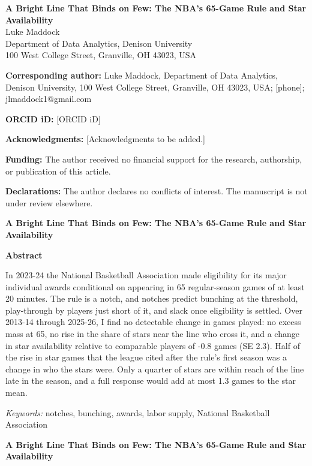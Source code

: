 \documentclass[12pt]{article}
\newcommand{\lone}[1]{\par\medskip\noindent\begin{center}\textbf{#1}\end{center}\par\nopagebreak}
\begin{document}
\thispagestyle{plain}
\begin{center}
{\large\textbf{A Bright Line That Binds on Few: The NBA's 65-Game Rule and Star Availability}}\\[2em]
Luke Maddock\\
Department of Data Analytics, Denison University\\
100 West College Street, Granville, OH 43023, USA\\[2em]
\end{center}
\noindent\textbf{Corresponding author:} 
Luke Maddock, Department of Data Analytics, Denison University, 100 West College Street, Granville, OH 43023, USA; [phone]; jlmaddock1@gmail.com
\par
\noindent\textbf{ORCID iD:} 
[ORCID iD]
\par
\noindent\textbf{Acknowledgments:} 
[Acknowledgments to be added.]
\par
\noindent\textbf{Funding:} 
The author received no financial support for the research, authorship, or publication of this article.
\par
\noindent\textbf{Declarations:} 
The author declares no conflicts of interest. The manuscript is not under review elsewhere.
\par
\clearpage
\begin{center}\textbf{
A Bright Line That Binds on Few: The NBA's 65-Game Rule and Star Availability
}\end{center}
\lone{Abstract}
\noindent 
In 2023-24 the National Basketball Association made eligibility for its major individual awards conditional on appearing in 65 regular-season games of at least 20 minutes. The rule is a notch, and notches predict bunching at the threshold, play-through by players just short of it, and slack once eligibility is settled. Over 2013-14 through 2025-26, I find no detectable change in games played: no excess mass at 65, no rise in the share of stars near the line who cross it, and a change in star availability relative to comparable players of -0.8 games (SE 2.3). Half of the rise in star games that the league cited after the rule's first season was a change in who the stars were. Only a quarter of stars are within reach of the line late in the season, and a full response would add at most 1.3 games to the star mean.
\par\bigskip
\noindent\emph{Keywords:} 
notches, bunching, awards, labor supply, National Basketball Association
\clearpage
\begin{center}\textbf{
A Bright Line That Binds on Few: The NBA's 65-Game Rule and Star Availability
}\end{center}
\end{document}
